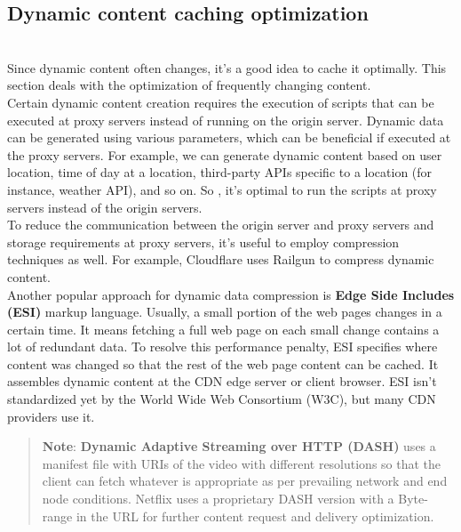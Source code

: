 \subsection{Dynamic content caching optimization}\label{NhqtbGhMJKcagmeJJhO4s}
\\
Since dynamic content often changes, it's a good idea to cache it optimally. This section deals with the optimization of frequently changing content.
\\
Certain dynamic content creation requires the execution of scripts that can be executed at proxy servers instead of running on the origin server. Dynamic data can be generated using various parameters, which can be beneficial if executed at the proxy servers. For example, we can generate dynamic content based on user location, time of day at a location, third-party APIs specific to a location (for instance, weather API), and so on. So , it's optimal to run the scripts at proxy servers instead of the origin servers.
\\
To reduce the communication between the origin server and proxy servers and storage requirements at proxy servers, it's useful to employ compression techniques as well. For example, Cloudflare uses Railgun to compress dynamic content.
\\
Another popular approach for dynamic data compression is \textbf{Edge Side Includes (ESI)} markup language. Usually, a small portion of the web pages changes in a certain time. It means fetching a full web page on each small change contains a lot of redundant data. To resolve this performance penalty, ESI specifies where content was changed so that the rest of the web page content can be cached. It assembles dynamic content at the CDN edge server or client browser. ESI isn't standardized yet by the World Wide Web Consortium (W3C), but many CDN providers use it.
\begin{quote}
\textbf{Note}: \textbf{Dynamic Adaptive Streaming over HTTP (DASH)} uses a manifest file with URIs of the video with different resolutions so that the client can fetch whatever is appropriate as per prevailing network and end node conditions. Netflix uses a proprietary DASH version with a Byte-range in the URL for further content request and delivery optimization.
\end{quote}
